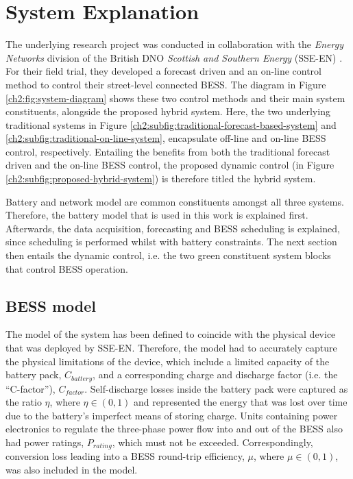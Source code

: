 \section{System Explanation}
\label{ch2:sec:system-explanation}



The underlying research project was conducted in collaboration with the \textit{Energy Networks} division of the British DNO \textit{Scottish and Southern Energy} (SSE-EN) \cite{NTVV2016}.
For their field trial, they developed a forecast driven and an on-line control method to control their street-level connected BESS.
The diagram in Figure \ref{ch2:fig:system-diagram} shows these two control methods and their main system constituents, alongside the proposed hybrid system.
Here, the two underlying traditional systems in Figure \ref{ch2:subfig:traditional-forecast-based-system} and \ref{ch2:subfig:traditional-on-line-system}, encapsulate off-line and on-line BESS control, respectively.
Entailing the benefits from both the traditional forecast driven and the on-line BESS control, the proposed dynamic control (in Figure \ref{ch2:subfig:proposed-hybrid-system}) is therefore titled the hybrid system.

Battery and network model are common constituents amongst all three systems.
Therefore, the battery model that is used in this work is explained first.
Afterwards, the data acquisition, forecasting and BESS scheduling is explained, since scheduling is performed whilst with battery constraints.
The next section then entails the dynamic control, i.e. the two green constituent system blocks that control BESS operation.

\subsection{BESS model}

The model of the system has been defined to coincide with the physical device that was deployed by SSE-EN.
Therefore, the model had to accurately capture the physical limitations of the device, which include a limited capacity of the battery pack, $C_{battery}$, and a corresponding charge and discharge factor (i.e. the ``C-factor''), $C_{factor}$.
Self-discharge losses inside the battery pack were captured as the ratio $\eta$, where $\eta \in (0, 1)$ and represented the energy that was lost over time due to the battery's imperfect means of storing charge.
Units containing power electronics to regulate the three-phase power flow into and out of the BESS also had power ratings, $P_{rating}$, which must not be exceeded.
Correspondingly, conversion loss leading into a BESS round-trip efficiency, $\mu$, where $\mu \in (0, 1)$, was also included in the model.

